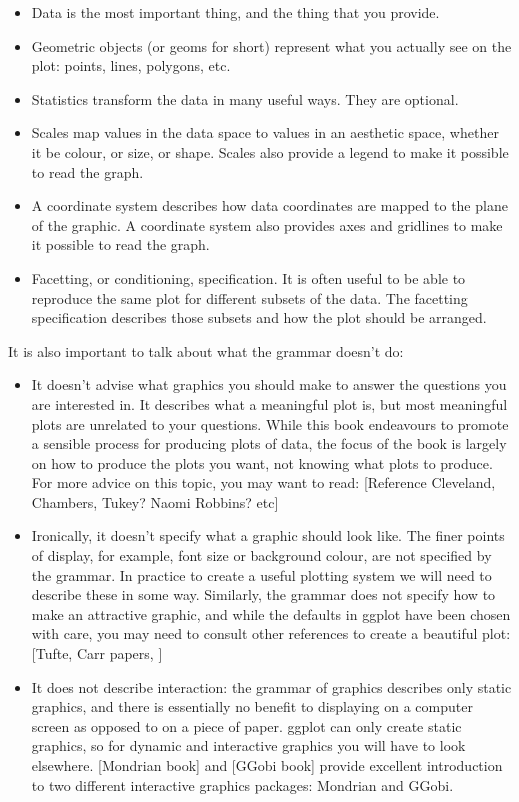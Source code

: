 \begin{itemize}
	\item Data is the most important thing, and the thing that you provide.
	\item Geometric objects (or geoms for short) represent what you actually see on the plot: points, lines, polygons, etc.
	\item Statistics transform the data in many useful ways.  They are optional.
	\item Scales map values in the data space to values in an aesthetic space, whether it be colour, or size, or shape.  Scales also provide a legend to make it possible to read the graph.
	\item A coordinate system describes how data coordinates are mapped to the plane of the graphic.  A coordinate system also provides axes and gridlines to make it possible to read the graph.
	\item Facetting, or conditioning, specification.  It is often useful to be able to reproduce the same plot for different subsets of the data.  The facetting specification describes those subsets and how the plot should be arranged.
\end{itemize}

It is also important to talk about what the grammar doesn't do:

\begin{itemize}
	\item It doesn't advise what graphics you should make to answer the questions you are interested in.  It describes what a meaningful plot is, but most meaningful plots are unrelated to your questions. While this book endeavours to promote a sensible process for producing plots of data, the focus of the book is largely on how to produce the plots you want, not knowing what plots to produce. For more advice on this topic, you may want to read: [Reference Cleveland, Chambers, Tukey? Naomi Robbins? etc]

	\item Ironically, it doesn't specify what a graphic should look like.  The finer points of display, for example, font size or background colour, are not specified by the grammar.  In practice to create a useful plotting system we will need to describe these in some way. Similarly, the grammar does not specify how to make an attractive graphic, and while the defaults in ggplot have been chosen with care, you may need to consult other references to create a beautiful plot: [Tufte, Carr papers, ]

	\item It does not describe interaction: the grammar of graphics describes only static graphics, and there is essentially no benefit to displaying on a computer screen as opposed to on a piece of paper.  ggplot can only create static graphics, so for dynamic and interactive graphics you will have to look elsewhere.  [Mondrian book] and [GGobi book] provide excellent introduction to two different interactive graphics packages: Mondrian and GGobi.

\end{itemize}

